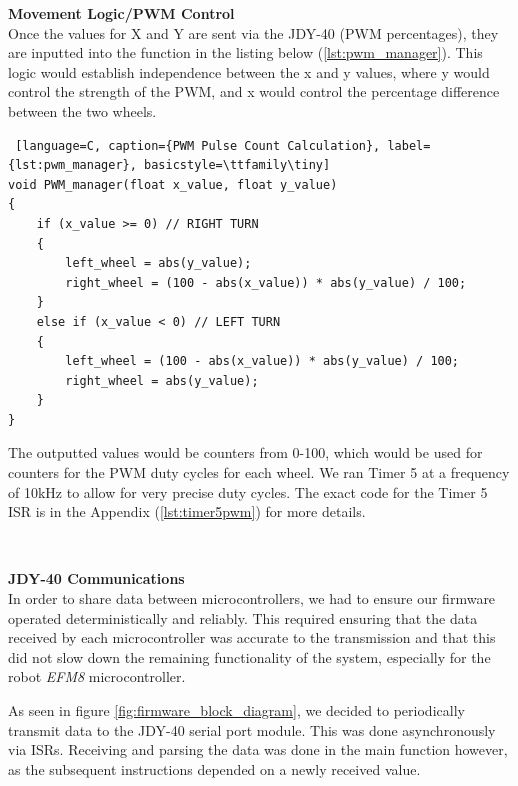 \documentclass{article}
\begin{document}
\textbf{Movement Logic/PWM Control} \\
Once the values for X and Y are sent via the JDY-40 (PWM percentages), they are inputted into the function in the listing below (\ref{lst:pwm_manager}). This logic would establish independence between the x and y values, where y would control the strength of the PWM, and x would control the percentage difference between the two wheels.

\begin{lstlisting} [language=C, caption={PWM Pulse Count Calculation}, label={lst:pwm_manager}, basicstyle=\ttfamily\tiny]
void PWM_manager(float x_value, float y_value)
{
    if (x_value >= 0) // RIGHT TURN
    {
        left_wheel = abs(y_value);
        right_wheel = (100 - abs(x_value)) * abs(y_value) / 100;
    }
    else if (x_value < 0) // LEFT TURN
    {
        left_wheel = (100 - abs(x_value)) * abs(y_value) / 100;
        right_wheel = abs(y_value);
    }
}
\end{lstlisting}

The outputted values would be counters from 0-100, which would be used for counters for the PWM duty cycles for each wheel. We ran Timer 5 at a frequency of 10kHz to allow for very precise duty cycles. The exact code for the Timer 5 ISR is in the Appendix (\ref{lst:timer5pwm}) for more details.

\

\textbf{JDY-40 Communications} \\



In order to share data between microcontrollers, we had to ensure our firmware operated deterministically and reliably.
This required ensuring that the data received by each microcontroller was accurate to the transmission and that this did not slow down the remaining functionality of the
system, especially for the robot \textit{EFM8} microcontroller.

As seen in figure \ref{fig:firmware_block_diagram}, we decided to periodically transmit data to the JDY-40 serial port module. This was done
asynchronously via ISRs. Receiving and parsing the data was done in the main function however,
as the subsequent instructions depended on a newly received value.
\end{document}
